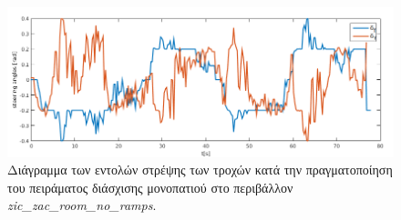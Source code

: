 \begin{figure}[!ht]
	\centering
	\includegraphics[width=0.9\linewidth]{Chapters/Chapter5/Figures/ptc_experiments/plots/zic_zac_room_no_ramps/fsa_rsa.png}
	\caption{Διάγραμμα των εντολών στρέψης των τροχών κατά την πραγματοποίηση του πειράματος διάσχισης μονοπατιού στο περιβάλλον \textit{zic{\_}zac{\_}room{\_}no{\_}ramps}.}
	\label{fig:zic_zac_room_no_ramps_fsa_rsa}
\end{figure}

